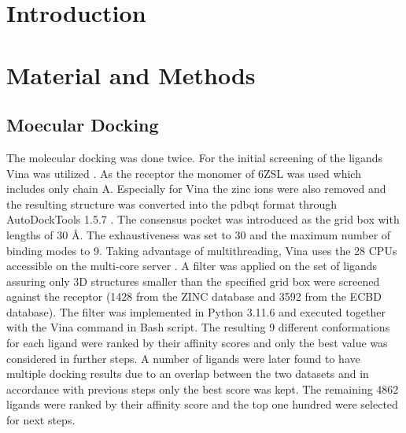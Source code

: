 \documentclass[11pt, letterpaper, titlepage]{article}
\renewcommand{\cite}{\parencite}
\begin{document}
\section{Introduction}

\section{Material and Methods}

\subsection{Moecular Docking}
The molecular docking was done twice. 
For the initial screening of the ligands \ac{Vina} was utilized \cite{Trott.2010}. As the receptor the monomer of 6ZSL was used which includes only chain A. Especially for \ac{Vina} the zinc ions were also removed and the resulting structure was converted into the pdbqt format through AutoDockTools 1.5.7 \cite{Goodsell2021}. The consensus pocket was introduced as the grid box with lengths of 30 \AA. The exhaustiveness was set to 30 and the maximum number of binding modes to 9. Taking advantage of multithreading, \ac{Vina} uses the 28 CPUs accessible on the multi-core server \cite{Che2023}. A filter was applied on the set of ligands assuring only 3D structures smaller than the specified grid box were screened against the receptor (1428 from the ZINC database and 3592 from the ECBD database). The filter was implemented in Python 3.11.6 and executed together with the \ac{Vina} command in Bash script. The resulting 9 different conformations for each ligand were ranked by their affinity scores and only the best value was considered in further steps. A number of ligands were later found to have multiple docking results due to an overlap between the two datasets and in accordance with previous steps only the best score was kept. The remaining 4862 ligands were ranked by their affinity score and the top one hundred were selected for next steps. \\
\end{document}
